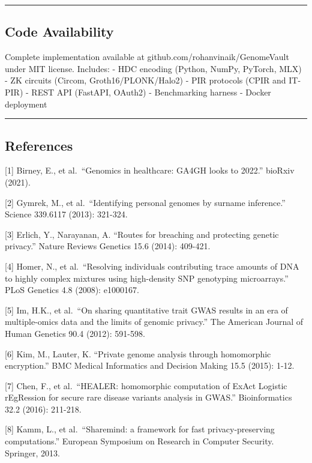 \documentclass[
  11pt,
]{article}
\begin{document}
\begin{center}\rule{0.5\linewidth}{0.5pt}\end{center}

\subsection{Code Availability}\label{code-availability}

Complete implementation available at github.com/rohanvinaik/GenomeVault
under MIT license. Includes: - HDC encoding (Python, NumPy, PyTorch,
MLX) - ZK circuits (Circom, Groth16/PLONK/Halo2) - PIR protocols (CPIR
and IT-PIR) - REST API (FastAPI, OAuth2) - Benchmarking harness - Docker
deployment

\begin{center}\rule{0.5\linewidth}{0.5pt}\end{center}

\subsection{References}\label{references}

{[}1{]} Birney, E., et al.~``Genomics in healthcare: GA4GH looks to
2022.'' bioRxiv (2021).

{[}2{]} Gymrek, M., et al.~``Identifying personal genomes by surname
inference.'' Science 339.6117 (2013): 321-324.

{[}3{]} Erlich, Y., Narayanan, A. ``Routes for breaching and protecting
genetic privacy.'' Nature Reviews Genetics 15.6 (2014): 409-421.

{[}4{]} Homer, N., et al.~``Resolving individuals contributing trace
amounts of DNA to highly complex mixtures using high-density SNP
genotyping microarrays.'' PLoS Genetics 4.8 (2008): e1000167.

{[}5{]} Im, H.K., et al.~``On sharing quantitative trait GWAS results in
an era of multiple-omics data and the limits of genomic privacy.'' The
American Journal of Human Genetics 90.4 (2012): 591-598.

{[}6{]} Kim, M., Lauter, K. ``Private genome analysis through
homomorphic encryption.'' BMC Medical Informatics and Decision Making
15.5 (2015): 1-12.

{[}7{]} Chen, F., et al.~``HEALER: homomorphic computation of ExAct
Logistic rEgRession for secure rare disease variants analysis in GWAS.''
Bioinformatics 32.2 (2016): 211-218.

{[}8{]} Kamm, L., et al.~``Sharemind: a framework for fast
privacy-preserving computations.'' European Symposium on Research in
Computer Security. Springer, 2013.
\end{document}
